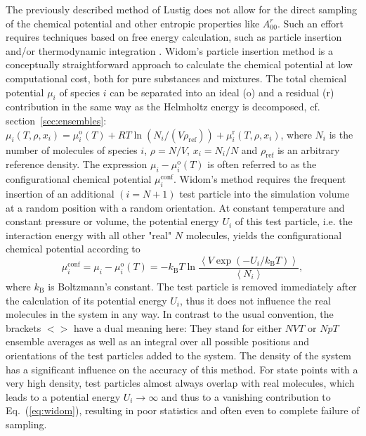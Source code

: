\documentclass[preprint,12pt]{elsarticle}
\begin{document}
The previously described method of Lustig does not allow for the direct sampling of the chemical potential and other entropic properties like $A^{r}_{00}$. Such an effort requires techniques based on free energy calculation, such as particle insertion and/or thermodynamic integration \cite{fre02}. Widom's particle insertion method \cite{wid63} is a conceptually straightforward approach to calculate the chemical potential at low computational cost, both for pure substances and mixtures. The total chemical potential $\mu_{i}$ of species $i$ can be separated into an ideal (o) and a residual (r) contribution in the same way as the Helmholtz energy is decomposed, cf. section~\ref{sec:ensembles}: $\mu_{i} (T,\rho,x_i) = \mu^\text{o}_{i}(T) + RT \ln (N_i/(V \rho_\text{ref})) + \mu^\text{r}_{i} (T,\rho,x_i)$, where $N_i$ is the number of molecules of species $i$, $\rho=N/V$, $x_i=N_i/N$ and $\rho_\text{ref}$ is an arbitrary reference density. The expression $\mu_{i} - \mu^\text{o}_{i}(T)$ is often referred to as the configurational chemical potential $\mu^\text{conf}_{i}$. Widom's method requires the frequent insertion of an additional $(i=N+1)$ test particle into the simulation volume at a random position with a random orientation. At constant temperature and constant pressure or volume, the potential energy $U_i$ of this test particle, i.e. the interaction energy with all other "real" $N$ molecules, yields the configurational chemical potential according to
\begin{equation}
\mu^\text{conf}_{i}=\mu_{i}-\mu^{\text{o}}_{i}\left(T\right)=-k_{\text{B}}T \ln \frac{\left\langle V \exp \left(-U_i/k_{\text{B}}T\right)\right\rangle}{\left\langle N_{i}\right\rangle},
\label{eq:widom}
\end{equation}
where $k_\text{B}$ is Boltzmann's constant. The test particle is removed immediately after the calculation of its potential energy $U_i$, thus it does not influence the real molecules in the system in any way. In contrast to the usual convention, the brackets $<>$  have a dual meaning here: They stand for either $NVT$ or $NpT$ ensemble averages as well as an integral over all possible positions and orientations of the test particles added to the system. The density of the system has a significant influence on the accuracy of this method. For state points with a very high density, test particles almost always overlap with real molecules, which leads to a potential energy $U_i \rightarrow \infty$ and thus to a vanishing contribution to Eq.~(\ref{eq:widom}), resulting in poor statistics and often even to complete failure of sampling.\\
\end{document}
